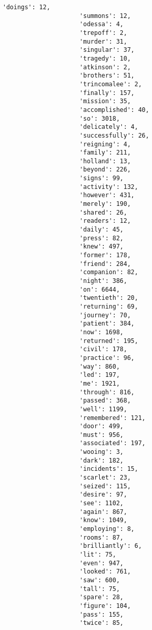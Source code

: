 \documentclass[11pt]{article}
\begin{document}
\begin{Verbatim}[commandchars=\\\{\}]
                     'doings': 12,
                     'summons': 12,
                     'odessa': 4,
                     'trepoff': 2,
                     'murder': 31,
                     'singular': 37,
                     'tragedy': 10,
                     'atkinson': 2,
                     'brothers': 51,
                     'trincomalee': 2,
                     'finally': 157,
                     'mission': 35,
                     'accomplished': 40,
                     'so': 3018,
                     'delicately': 4,
                     'successfully': 26,
                     'reigning': 4,
                     'family': 211,
                     'holland': 13,
                     'beyond': 226,
                     'signs': 99,
                     'activity': 132,
                     'however': 431,
                     'merely': 190,
                     'shared': 26,
                     'readers': 12,
                     'daily': 45,
                     'press': 82,
                     'knew': 497,
                     'former': 178,
                     'friend': 284,
                     'companion': 82,
                     'night': 386,
                     'on': 6644,
                     'twentieth': 20,
                     'returning': 69,
                     'journey': 70,
                     'patient': 384,
                     'now': 1698,
                     'returned': 195,
                     'civil': 178,
                     'practice': 96,
                     'way': 860,
                     'led': 197,
                     'me': 1921,
                     'through': 816,
                     'passed': 368,
                     'well': 1199,
                     'remembered': 121,
                     'door': 499,
                     'must': 956,
                     'associated': 197,
                     'wooing': 3,
                     'dark': 182,
                     'incidents': 15,
                     'scarlet': 23,
                     'seized': 115,
                     'desire': 97,
                     'see': 1102,
                     'again': 867,
                     'know': 1049,
                     'employing': 8,
                     'rooms': 87,
                     'brilliantly': 6,
                     'lit': 75,
                     'even': 947,
                     'looked': 761,
                     'saw': 600,
                     'tall': 75,
                     'spare': 28,
                     'figure': 104,
                     'pass': 155,
                     'twice': 85,

\end{Verbatim}
\end{document}
